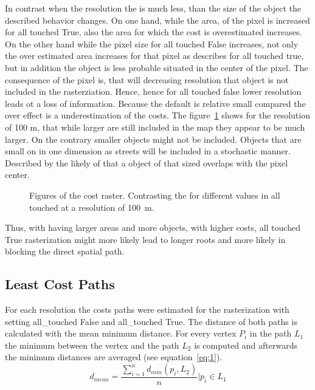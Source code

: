 \documentclass[acmtog]{acmart}
\begin{document}
	In contrast when the resolution the is much less, than the size of the object the described behavior changes.
	On one hand, while the area, of the pixel is increased for all touched True, also the area for which the cost is overestimated increases.
	On the other hand while the pixel size for all touched  False increases, not only the over estimated area increases for that pixel as describes for all touched true, but in addition the object is less probable situated in the center of the pixel.
	The consequence of the pixel is, that will decreasing resolution that object is not included in the rasterziation.
	Hence, hence for all touched false lower resolution  leads ot a loss of information.
	Because the default is relative small compared the over effect is a underestimation of the costs.
	The figure~\ref{fig:costs_100m} shows for the resolution of 100 m, that while larger are still included in the map they appear to be much larger.
	On the contrary smaller objects might not be included.
	Objects that are small on in one dimension as streets will be included in a stochastic manner.
	Described by the likely of that a object of that sized overlaps with the pixel center.
	\begin{figure}
		\centering
		
		\qquad
		\caption{Figures of the cost raster. Contrasting the for different values in all touched at a resolution of 100~m.}
		\label{fig:costs_100m}
	\end{figure}
	Thus, with having larger areas and more objects, with higher costs, all touched True rasterization might more likely lead to longer roots and more likely in blocking the  direct spatial path.
	
	\subsection{Least Cost Paths}\label{subsec:least-cost-paths}
	For each resolution the costs paths were estimated for the rasterization with setting all\_touched False
	and all\_touched True.
	The distance of both paths is calculated with the mean minimum distance.
	For every vertex $P_i$ in the path $L_1$ the minimum between the vertex and the path $L_2$
	is computed and afterwards the minimum distances are averaged (see equation~\ref{eq:1}).
	\begin{equation}
		\label{eq:1}
		d_{mean} = \frac{\sum_{i=1}^{n} d_{min}(p_i, L_2)}{n} \bigg\vert p_i \in L_1
	\end{equation}
\end{document}
